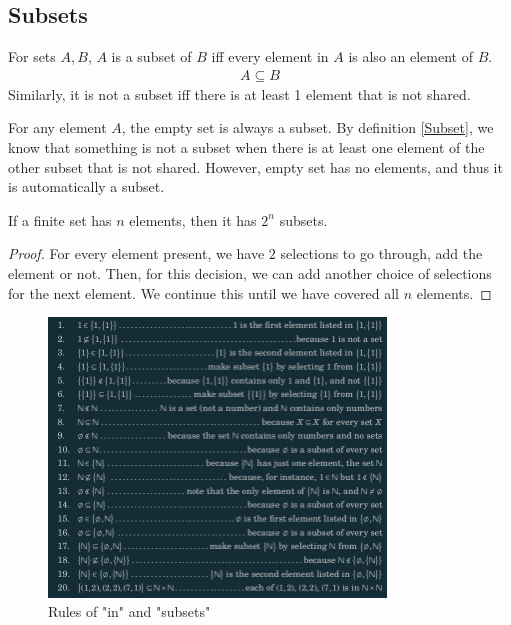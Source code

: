 \documentclass[a4paper]{article}
\theoremstyle{plain}
\newtheorem{thm}{Theorem}[section]
\theoremstyle{definition}
\newtheorem{defn}{Definition}[section]
\theoremstyle{remark}
\begin{document}
\subsection{Subsets}
\begin{tcolorbox}[colback=black!3!white,colframe=black!60!white,title=\begin{defn}Subset \label{Subset}\end{defn}]
For sets $A,B$, $A$ is a subset of $B$ iff every element in $A$ is also an element of $B$.
\begin{align}
	A \subseteq B
\end{align}
Similarly, it is not a subset iff there is at least 1 element that is not shared.
\end{tcolorbox}
\begin{tcolorbox}[colback=black!3!white,colframe=black!60!white,title=\begin{defn}$\varnothing \subseteq A$ \label{varnothing subseteq A}\end{defn}]
For any element $A$, the empty set is always a subset. By definition \ref{Subset}, we know that something is not a subset when there is at least one element of the other subset that is not shared. However, empty set has no elements, and thus it is automatically a subset. 
\end{tcolorbox}
\begin{tcolorbox}[colback=black!3!white,colframe=black!60!white,title=\begin{thm}$2^n$ Subsets \label{$2^n$ Subsets}\end{thm}]
If a finite set has $n$ elements, then it has $2^n$ subsets.
\begin{proof}
	For every element present, we have $2$ selections to go through, add the element or not. Then, for this decision, we can add another choice of selections for the next element. We continue this until we have covered all $n$ elements.
\end{proof}
\end{tcolorbox}

\begin{figure}[H]
	\centering
	\includegraphics[width=0.8\textwidth]{figures/subsets.png}
	\caption{Rules of "in" and "subsets"}
	\label{fig:figures-subsets-png}
\end{figure}
\end{document}

